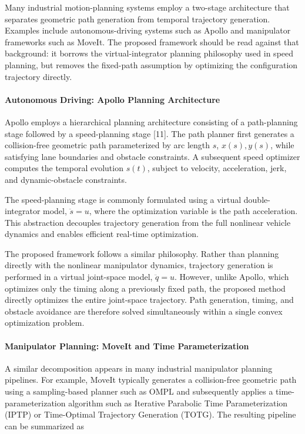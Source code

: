 Many industrial motion-planning systems employ a two-stage architecture
that separates geometric path generation from temporal trajectory
generation. Examples include autonomous-driving systems such as Apollo
and manipulator frameworks such as MoveIt. The proposed framework should
be read against that background: it borrows the virtual-integrator
planning philosophy used in speed planning, but removes the fixed-path
assumption by optimizing the configuration trajectory directly.

\paragraph{Autonomous Driving: Apollo Planning
Architecture}\label{autonomous-driving-apollo-planning-architecture}

Apollo employs a hierarchical planning architecture consisting of a
path-planning stage followed by a speed-planning stage {[}11{]}. The
path planner first generates a collision-free geometric path
parameterized by arc length \(s\), \(x(s),y(s)\), while satisfying lane
boundaries and obstacle constraints. A subsequent speed optimizer
computes the temporal evolution \(s(t)\), subject to velocity,
acceleration, jerk, and dynamic-obstacle constraints.

The speed-planning stage is commonly formulated using a virtual
double-integrator model, \(\ddot{s}=u\), where the optimization variable
is the path acceleration. This abstraction decouples trajectory
generation from the full nonlinear vehicle dynamics and enables
efficient real-time optimization.

The proposed framework follows a similar philosophy. Rather than
planning directly with the nonlinear manipulator dynamics, trajectory
generation is performed in a virtual joint-space model, \(\ddot{q}=u\).
However, unlike Apollo, which optimizes only the timing along a
previously fixed path, the proposed method directly optimizes the entire
joint-space trajectory. Path generation, timing, and obstacle avoidance
are therefore solved simultaneously within a single convex optimization
problem.

\paragraph{Manipulator Planning: MoveIt and Time
Parameterization}\label{manipulator-planning-moveit-and-time-parameterization}

A similar decomposition appears in many industrial manipulator planning
pipelines. For example, MoveIt typically generates a collision-free
geometric path using a sampling-based planner such as OMPL and
subsequently applies a time-parameterization algorithm such as Iterative
Parabolic Time Parameterization (IPTP) or Time-Optimal Trajectory
Generation (TOTG). The resulting pipeline can be summarized as

